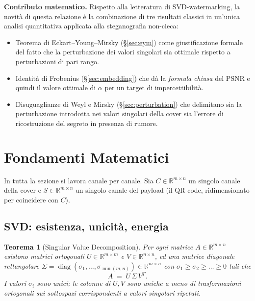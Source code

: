 \documentclass[11pt,a4paper]{article}
\newtheorem{theorem}{Teorema}
\theoremstyle{definition}
\theoremstyle{remark}
\DeclareMathOperator{\diag}{diag}
\begin{document}
\noindent\textbf{Contributo matematico.}  Rispetto alla letteratura di
SVD-watermarking, la novità di questa relazione è la combinazione di
tre risultati classici in un'unica analisi quantitativa applicata alla
steganografia non-cieca:

\begin{itemize}[leftmargin=*,itemsep=2pt]
  \item Teorema di Eckart--Young--Mirsky (\S\ref{sec:eym}) come
        giustificazione formale del fatto che la perturbazione dei
        valori singolari sia ottimale rispetto a perturbazioni di pari
        rango.
  \item Identità di Frobenius (\S\ref{sec:embedding}) che dà la
        \emph{formula chiusa} del PSNR e quindi il valore ottimale di
        $\alpha$ per un target di impercettibilità.
  \item Disuguaglianze di Weyl e Mirsky (\S\ref{sec:perturbation}) che
        delimitano sia la perturbazione introdotta nei valori singolari
        della cover sia l'errore di ricostruzione del segreto in presenza
        di rumore.
\end{itemize}


\section{Fondamenti Matematici}
\label{sec:math}

In tutta la sezione si lavora canale per canale.
Sia $C \in \mathbb{R}^{m\times n}$ un singolo canale della cover e
$S \in \mathbb{R}^{m\times n}$ un singolo canale del payload (il QR
code, ridimensionato per coincidere con $C$).

\subsection{SVD: esistenza, unicità, energia}
\label{sec:svd}

\begin{theorem}[Singular Value Decomposition]\label{thm:svd}
Per ogni matrice $A \in \mathbb{R}^{m\times n}$ esistono matrici
ortogonali $U \in \mathbb{R}^{m\times m}$ e $V \in \mathbb{R}^{n\times n}$,
ed una matrice diagonale rettangolare
$\Sigma = \diag(\sigma_1,\dots,\sigma_{\min(m,n)}) \in \mathbb{R}^{m\times n}$
con $\sigma_1 \geq \sigma_2 \geq \dots \geq 0$ tali che
\begin{equation}\label{eq:svd}
A \;=\; U \, \Sigma \, V^{T}.
\end{equation}
I valori $\sigma_i$ sono unici; le colonne di $U,V$ sono
uniche a meno di trasformazioni ortogonali sui sottospazi
corrispondenti a valori singolari ripetuti.
\end{theorem}
\end{document}
